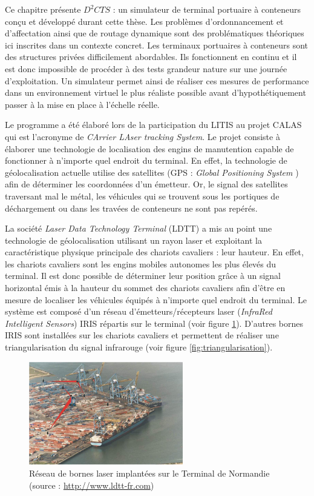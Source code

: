 
Ce chapitre présente $D^2CTS$ : un simulateur de terminal portuaire à conteneurs conçu et développé durant cette thèse. Les problèmes d'ordonnancement et d'affectation ainsi que de routage dynamique sont des problématiques théoriques ici inscrites dans un contexte concret. Les terminaux portuaires à conteneurs sont des structures privées difficilement abordables. Ils fonctionnent en continu et il est donc impossible de procéder à des tests grandeur nature sur une journée d'exploitation. Un simulateur permet ainsi de réaliser ces mesures de performance dans un environnement virtuel le plus réaliste possible avant d'hypothétiquement passer à la mise en place à l'échelle réelle. 

Le programme a été élaboré lors de la participation du LITIS au projet CALAS qui est l'acronyme de \textit{CArrier LAser tracking System}. Le projet consiste à élaborer une technologie de localisation des engins de manutention capable de fonctionner à n'importe quel endroit du terminal. En effet, la technologie de géolocalisation actuelle utilise des satellites (GPS : \textit{Global Positioning System}%
) afin de déterminer les coordonnées d'un émetteur. Or, le signal des satellites traversant mal le métal, les véhicules qui se trouvent sous les portiques de déchargement ou dans les travées de conteneurs ne sont pas repérés.

La société \textit{Laser Data Technology Terminal} (LDTT) a mis au point une technologie de géolocalisation utilisant un rayon laser et exploitant la caractéristique physique principale des chariots cavaliers : leur hauteur. En effet, les chariots cavaliers sont les engins mobiles autonomes les plus élevés du terminal. Il est donc possible de déterminer leur position grâce à un signal horizontal émis à la hauteur du sommet des chariots cavaliers afin d'être en mesure de localiser les véhicules équipés à n'importe quel endroit du terminal. Le système est composé d'un réseau d'émetteurs/récepteurs laser (\textit{InfraRed Intelligent Sensors}) IRIS répartis sur le terminal (voir figure \ref{fig:bornesLaser}). D'autres bornes IRIS sont installées sur les chariots cavaliers et permettent de réaliser une triangularisation du signal infrarouge (voir figure \ref{fig:triangularisation}).


\begin{figure}[ht]
\centering
 \includegraphics[width=0.6\textwidth]{./chapitres/simulation/bornesLaser.jpg}
  \caption{Réseau de bornes laser implantées sur le Terminal de Normandie (source : \href{http://www.ldtt-fr.com}{http://www.ldtt-fr.com})}
  \label{fig:bornesLaser}
\end{figure}

